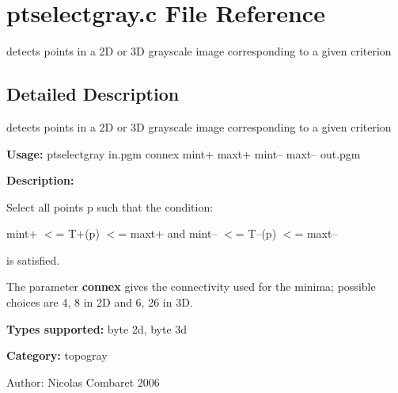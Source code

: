 \section{ptselectgray.c File Reference}
\label{ptselectgray_8c}
detects points in a 2D or 3D grayscale image corresponding to a given criterion 



\subsection{Detailed Description}
detects points in a 2D or 3D grayscale image corresponding to a given criterion 

{\bf Usage:} ptselectgray in.pgm connex mint+ maxt+ mint-- maxt-- out.pgm

{\bf Description:}

Select all points p such that the condition:\par
 mint+ $<$= T+(p) $<$= maxt+ and mint-- $<$= T--(p) $<$= maxt--\par
 is satisfied.\par


The parameter {\bf connex} gives the connectivity used for the minima; possible choices are 4, 8 in 2D and 6, 26 in 3D.

{\bf Types supported:} byte 2d, byte 3d

{\bf Category:} topogray

\begin{Desc}
\item[Author:]Nicolas Combaret 2006 \end{Desc}
